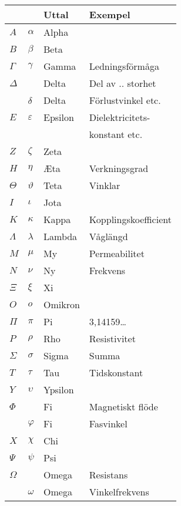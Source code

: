 \bigskip
  \begin{tabular}{ll|l|l}
        &    & Uttal & Exempel \\
    \hline
    \(A\) & \(\alpha\) & Alpha & \\
    \(B\) & \(\beta\) & Beta & \\
    \(\Gamma\) & \(\gamma\) & Gamma & Ledningsförmåga \\
    \(\Delta\) & & Delta & Del av .. storhet \\
    & \(\delta\) & Delta & Förlustvinkel etc. \\
    \(E\) & \(\varepsilon\) & Epsilon & Dielektricitets-\\
    & & & konstant etc.\\
    \(Z\) & \(\zeta\) & Zeta & \\
    \(H\) & \(\eta\) & \AE ta & Verkningsgrad\\
    \(\Theta\) & \(\vartheta\) & Teta & Vinklar \\
    \(I\) & \(\iota\) & Jota & \\
    \(K\) & \(\kappa\) & Kappa & Kopplingskoefficient \\
    \(\Lambda\) & \(\lambda\) & Lambda & Våglängd \\
    \(M\) & \(\mu\) & My & Permeabilitet \\
    \(N\) & \(\nu\) & Ny & Frekvens \\
    \(\Xi\) & \(\xi\) & Xi & \\
    \(O\) & \(o\) & Omikron & \\
    \(\Pi\) & \(\pi\) & Pi & 3,14159\dots \\
    \(P\) & \(\rho\) & Rho & Resistivitet \\
    \(\Sigma\) & \(\sigma\) & Sigma & Summa \\
    \(T\) & \(\tau\) & Tau & Tidskonstant \\
    \(Y\) & \(\upsilon\) & Ypsilon &  \\
    \(\Phi\) & & Fi & Magnetiskt flöde \\
    & \(\varphi\) & Fi & Fasvinkel \\
    \(X\) & \(\chi\) & Chi & \\
    \(\Psi\) & \(\psi\) & Psi & \\
    \(\Omega\) & & Omega & Resistans \\
    & \(\omega\) & Omega & Vinkelfrekvens \\
  \end{tabular}
